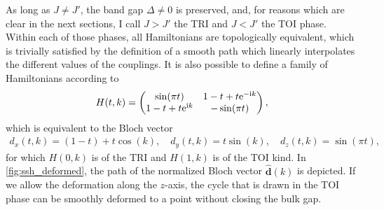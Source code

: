 As long as $J\neq J'$, the band gap $\Delta\neq0$ is preserved, and, for reasons which are clear in the next sections, I call $J>J'$ the TRI and $J<J'$ the TOI phase.
Within each of those phases, all Hamiltonians are topologically equivalent, which is trivially satisfied by the definition of a smooth path which linearly interpolates the different values of the couplings.
It is also possible to define a family of Hamiltonians according to
\begin{align}
    H(t,k) =
    \begin{pmatrix}
        \sin(\pi t) & 1-t + t\mathrm e^{-\mathrm i k} \\
        1-t + t\mathrm e^{\mathrm i k} & -\sin(\pi t)
    \end{pmatrix},
    \label{eq:hamiltonian_path}
\end{align}
which is equivalent to the Bloch vector
\begin{align}
    d_x(t,k) = (1-t)+t\cos(k),
    \quad
    d_y(t,k) = t\sin(k),
    \quad
    d_z(t,k) = \sin(\pi t),
\end{align}
for which $H(0,k)$ is of the TRI and $H(1,k)$ is of the TOI kind.
In \cref{fig:ssh_deformed}, the path of the normalized Bloch vector $\hat{\bm d}(k)$ is depicted.
If we allow the deformation along the $z$-axis, the cycle that is drawn in the TOI phase can be smoothly deformed to a point without closing the bulk gap.
